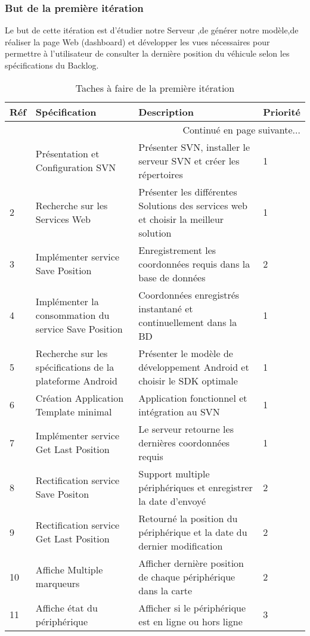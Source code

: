 \subsubsection{But de la première itération}

Le but de cette itération est d'étudier notre Serveur ,de générer notre modèle,de réaliser
la page Web (dashboard) et développer les vues nécessaires pour permettre à l'utilisateur
de consulter la dernière position du véhicule selon les spécifications du Backlog.

\begin{center}
    \footnotesize
    \begin{longtable}{| p{1cm} | p{5cm} | p{7cm} | p{1cm} |}
        \caption{Taches à faire de la première itération}
        \label{tab:sprint1-backlog} \\

 \hline
 \textbf{Réf} & \textbf{Spécification} & \textbf{Description} & \textbf{Priorité} \\ \hline
 \endhead

 \hline \multicolumn{4}{|r|}{{Continué en page suivante$\dotsc$}} \\ \hline
 \endfoot

 \hline \hline
 \endlastfoot

\hline
1 & Présentation et Configuration SVN & Présenter SVN, installer le serveur SVN et créer les répertoires  & 1 \\ \hline
2 & Recherche sur les Services Web & Présenter les différentes Solutions des services web et choisir la meilleur solution & 1 \\ \hline
3 & Implémenter service Save Position & Enregistrement les coordonnées requis dans la base de données & 2 \\ \hline
4 & Implémenter la consommation du service Save Position & Coordonnées enregistrés instantané et continuellement dans la BD & 1 \\ \hline
5 & Recherche sur les spécifications de la plateforme Android & Présenter le modèle de développement Android et choisir le SDK optimale & 1 \\ \hline
6 & Création Application Template minimal & Application fonctionnel et intégration au SVN & 1 \\ \hline
7 & Implémenter service Get Last Position & Le serveur retourne les dernières coordonnées requis & 1 \\ \hline
8 & Rectification service Save Positon & Support multiple périphériques et enregistrer la date d'envoyé & 2 \\ \hline
9 & Rectification service Get Last Position & Retourné la position du périphérique et la date du dernier modification & 2 \\ \hline
10 & Affiche Multiple marqueurs & Afficher dernière position de chaque périphérique dans la carte & 2 \\ \hline
11 & Affiche état du périphérique & Afficher si le périphérique est en ligne ou hors ligne & 3 \\ \hline
\end{longtable}
\end{center}

